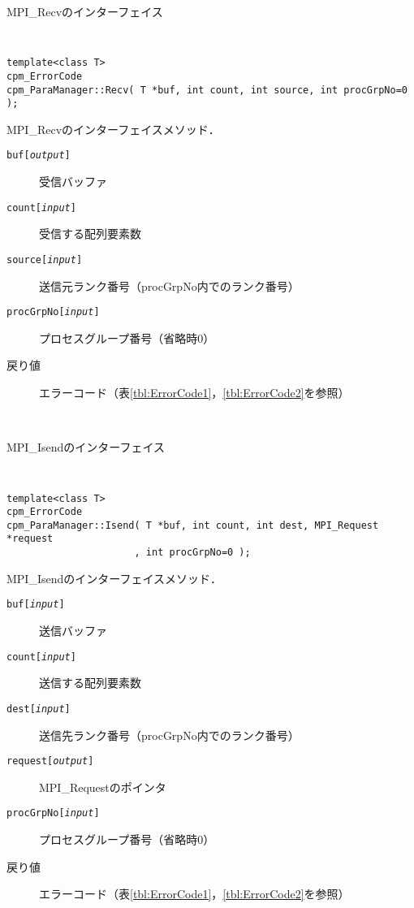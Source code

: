 \begin{spacing}{0.8}
\begin{itembox}[l]{MPI\_Recvのインターフェイス}
{\tt
\begin{verbatim}
template<class T>
cpm_ErrorCode
cpm_ParaManager::Recv( T *buf, int count, int source, int procGrpNo=0 );
\end{verbatim}
}
MPI\_Recvのインターフェイスメソッド．
\begin{description}
\item[{\tt buf[{\it output}]}] 受信バッファ
\item[{\tt count[{\it input}]}] 受信する配列要素数
\item[{\tt source[{\it input}]}] 送信元ランク番号（procGrpNo内でのランク番号）
\item[{\tt procGrpNo[{\it input}]}] プロセスグループ番号（省略時0）
\\
\item[戻り値] エラーコード（表\ref{tbl:ErrorCode1}，\ref{tbl:ErrorCode2}を参照）
\end{description}
\end{itembox}\\
\end{spacing}

\begin{spacing}{0.8}
\begin{itembox}[l]{MPI\_Isendのインターフェイス}
{\tt
\begin{verbatim}
template<class T>
cpm_ErrorCode
cpm_ParaManager::Isend( T *buf, int count, int dest, MPI_Request *request
                      , int procGrpNo=0 );
\end{verbatim}
}
MPI\_Isendのインターフェイスメソッド．
\begin{description}
\item[{\tt buf[{\it input}]}] 送信バッファ
\item[{\tt count[{\it input}]}] 送信する配列要素数
\item[{\tt dest[{\it input}]}] 送信先ランク番号（procGrpNo内でのランク番号）
\item[{\tt request[{\it output}]}] MPI\_Requestのポインタ
\item[{\tt procGrpNo[{\it input}]}] プロセスグループ番号（省略時0）
\\
\item[戻り値] エラーコード（表\ref{tbl:ErrorCode1}，\ref{tbl:ErrorCode2}を参照）
\end{description}
\end{itembox}\\
\end{spacing}

